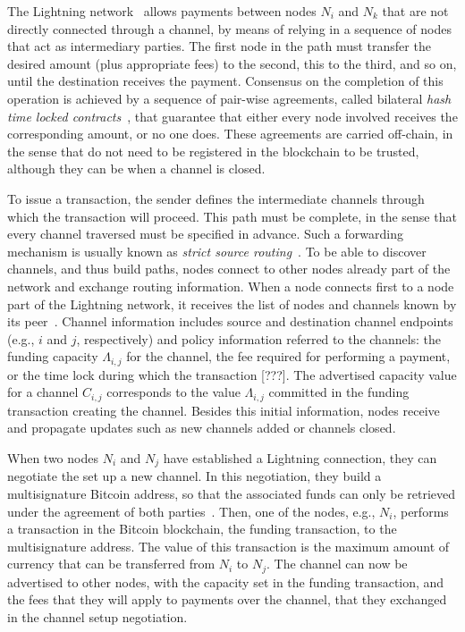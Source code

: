 The Lightning network~\cite{poon2016bitcoin} allows payments between nodes $N_i$ and $N_k$ that are not directly connected through a channel,
by means of relying in a sequence of nodes that act as intermediary parties.
The first node in the path must transfer the desired amount (plus appropriate fees) to the second, this to the third, and so on, until the destination receives the payment. 
Consensus on the completion of this operation is achieved by a sequence of pair-wise agreements, 
called bilateral \textit{hash time locked contracts}~\cite{BOLT_5_transaction_handling},
that guarantee that either every node involved receives the corresponding amount, or no one does.
These agreements are carried off-chain, in the sense that do not need to be registered in the blockchain to be trusted, 
although they can be when a channel is closed. 


To issue a transaction, the sender defines the intermediate channels through which the transaction will proceed. 
This path must be complete, in the sense that every channel traversed must be specified in advance.
Such a forwarding mechanism is usually known as \textit{strict source routing}~\cite{BOLT_4_onion_routing}.
To be able to discover channels, and thus build paths, nodes connect to other nodes already part of the network and exchange routing information. 
When a node connects first to a node part of the Lightning network, it receives the list of nodes and channels known by its peer~\cite{BOLT_7_routing_gossip}. 
Channel information includes source and destination channel endpoints (e.g., $i$ and $j$, respectively) 
and policy information referred to the channels: the funding capacity $\Lambda_{i,j}$ for the channel, the fee required for performing a payment, or the time lock during which the transaction [???]. 
The advertised capacity value for a channel $C_{i,j}$ corresponds to the value $\Lambda_{i,j}$ committed in the funding transaction creating the channel. 
Besides this initial information, nodes receive and propagate updates such as new channels added or channels closed.

When two nodes $N_i$ and $N_j$ have established a Lightning connection, they can negotiate the set up a new channel. 
In this negotiation, they build a multisignature Bitcoin address, so that the associated funds can only be retrieved under the agreement of both parties~\cite{poon2016bitcoin}.
Then, one of the nodes, e.g., $N_i$, performs a transaction in the Bitcoin blockchain, the funding transaction, to the multisignature address. 
The value of this transaction is the maximum amount of currency that can be transferred from $N_i$ to $N_j$.
The channel can now be advertised to other nodes, with the capacity set in the funding transaction, and the fees that they will apply to payments over the channel, that they exchanged in the channel setup negotiation.

